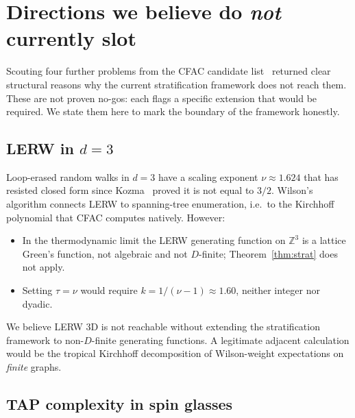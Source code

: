 \documentclass[10pt,a4paper,twocolumn]{article}
\theoremstyle{plain}
\theoremstyle{definition}
\begin{document}
\section{Directions we believe do \emph{not} currently slot}
\label{sec:boundary}

Scouting four further problems from the CFAC candidate
list~\citep[\texttt{docs/problems.md}]{AmarteifioProblems2026}
returned clear structural reasons why the current stratification
framework does not reach them.  These are not proven no-gos: each
flags a specific extension that would be required.  We state them
here to mark the boundary of the framework honestly.

\subsection{LERW in $d=3$}

Loop-erased random walks in $d=3$ have a scaling exponent
$\nu \approx 1.624$ that has resisted closed form since
Kozma~\citep{Kozma2007} proved it is not equal to $3/2$.
Wilson's algorithm connects LERW to spanning-tree enumeration,
i.e.\ to the Kirchhoff polynomial that CFAC computes natively.
However:
\begin{itemize}[leftmargin=1.2em,itemsep=1pt]
  \item In the thermodynamic limit the LERW generating function
    on $\mathbb{Z}^3$ is a lattice Green's function, not algebraic
    and not $D$-finite; Theorem~\ref{thm:strat} does not apply.
  \item Setting $\tau = \nu$ would require $k = 1/(\nu-1) \approx
    1.60$, neither integer nor dyadic.
\end{itemize}
We believe LERW 3D is not reachable without extending the
stratification framework to non-$D$-finite generating functions.
A legitimate adjacent calculation would be the tropical Kirchhoff
decomposition of Wilson-weight expectations on \emph{finite}
graphs.

\subsection{TAP complexity in spin glasses}
\end{document}
